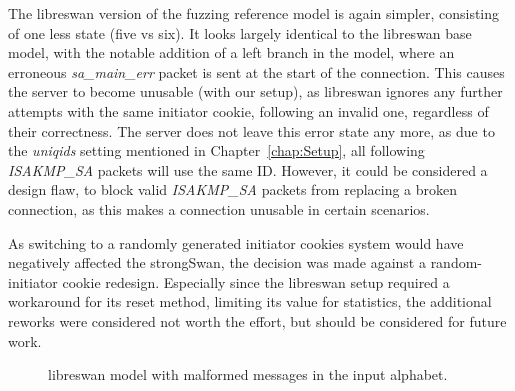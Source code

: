 The libreswan version of the fuzzing reference model is again simpler, consisting of one less state (five vs six). It looks largely identical to the libreswan base model, with the notable addition of a left branch in the model, where an erroneous \emph{sa\_main\_err} packet is sent at the start of the connection. This causes the server to become unusable (with our setup), as libreswan ignores any further attempts with the same initiator cookie, following an invalid one, regardless of their correctness. The server does not leave this error state any more, as due to the \emph{uniqids} setting mentioned in Chapter~\ref{chap:Setup}, all following \emph{ISAKMP\_SA} packets will use the same ID. However, it could be considered a design flaw, to block valid \emph{ISAKMP\_SA} packets from replacing a broken connection, as this makes a connection unusable in certain scenarios.

As switching to a randomly generated initiator cookies system would have negatively affected the strongSwan, the decision was made against a random-initiator cookie redesign. Especially since the libreswan setup required a workaround for its reset method, limiting its value for statistics, the additional reworks were considered not worth the effort, but should be considered for future work.

\begin{figure}
	\vspace*{\fill}
	\noindent
	\hspace*{-4.5\oddsidemargin}%
	\caption{libreswan model with malformed messages in the input alphabet.}
	\label{fig:learnedmodellibrereference}
	\vspace*{\fill}
\end{figure}

\newpage

